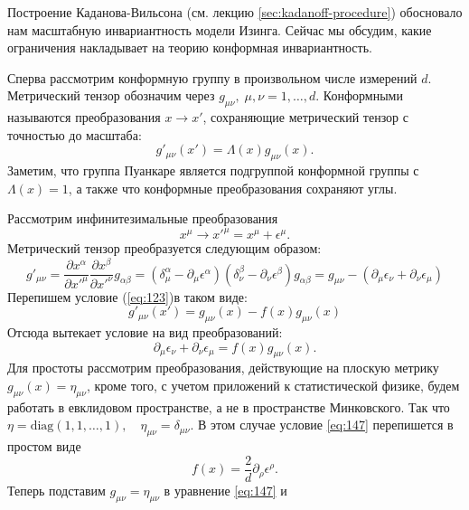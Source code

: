 \documentclass[a4paper,12pt]{article} \usepackage[utf8x]{inputenc} \usepackage[russian]{babel}
\theoremstyle{definition} \newtheorem{corollary}{Corollary}[theorem] \theoremstyle{definition}
\begin{document}
Построение Каданова-Вильсона (см. лекцию \ref{sec:kadanoff-procedure}) обосновало нам масштабную
инвариантность модели Изинга. Сейчас мы обсудим, какие ограничения накладывает на теорию конформная
инвариантность.

Сперва рассмотрим конформную группу в произвольном числе измерений $d$. Метрический тензор обозначим
через $g_{\mu\nu},\; \mu,\nu=1,\dots,d$. Конформными называются преобразования $x\to x'$,
сохраняющие метрический тензор с точностью до масштаба:
\begin{equation}
  \label{eq:123} g'_{\mu\nu}(x')=\Lambda(x) g_{\mu\nu}(x).
\end{equation} Заметим, что группа Пуанкаре является подгруппой конформной группы с $\Lambda(x)=1$,
а также что конформные преобразования сохраняют углы.

Рассмотрим инфинитезимальные преобразования
\begin{equation}
  \label{eq:144} x^{\mu}\to x'^{\mu}=x^{\mu}+\epsilon^{\mu}.
\end{equation} Метрический тензор преобразуется следующим образом:
\begin{equation}
  \label{eq:145} g'_{\mu\nu}=\frac{\partial x^{\alpha}}{\partial x'^{\mu}}\frac{\partial
x^{\beta}}{\partial x'^{\nu}}
g_{\alpha\beta}=(\delta^{\alpha}_{\mu}-\partial_{\mu}\epsilon^{\alpha})(\delta^{\beta}_{\nu}-\partial_{\nu}
\epsilon^{\beta})g_{\alpha\beta}=g_{\mu\nu}-(\partial_{\mu}\epsilon_{\nu}+\partial_{\nu}\epsilon_{\mu})
\end{equation} Перепишем условие (\ref{eq:123})в таком виде:
\begin{equation}
  \label{eq:146} g'_{\mu\nu}(x')=g_{\mu\nu}(x)-f(x)g_{\mu\nu}(x)
\end{equation} Отсюда вытекает условие на вид преобразований:
\begin{equation}
  \label{eq:147}
  \partial_{\mu}\epsilon_{\nu}+\partial_{\nu}\epsilon_{\mu}=f(x)g_{\mu\nu}(x).
\end{equation} Для простоты рассмотрим преобразования, действующие на плоскую метрику
$g_{\mu\nu}(x)=\eta_{\mu\nu}$, кроме того, с учетом приложений к статистической физике, будем
работать в евклидовом пространстве, а не в пространстве Минковского. Так что
$\eta=\mathrm{diag}(1,1,\dots,1),\quad \eta_{\mu\nu}=\delta_{\mu\nu}$. В этом случае условие
\eqref{eq:147} перепишется в простом виде
\begin{equation}
  \label{eq:148} f(x)=\frac{2}{d}\partial_{\rho}\epsilon^{\rho}.
\end{equation} Теперь подставим $g_{\mu\nu}=\eta_{\mu\nu}$ в уравнение \eqref{eq:147} и
\end{document}
